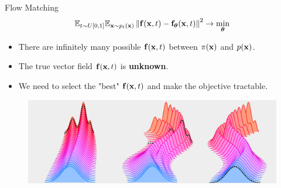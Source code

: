\documentclass{beamer}
\begin{document}
\begin{frame}{Flow Matching}
	\[
		\mathbb{E}_{t \sim U[0, 1]} \mathbb{E}_{\mathbf{x} \sim p_t(\mathbf{x})}\left\| \mathbf{f}(\mathbf{x}, t) - \mathbf{f}_{\boldsymbol{\theta}}(\mathbf{x}, t) \right\|^2 \rightarrow \min_{\boldsymbol{\theta}}
	\]
	\vspace{-0.5cm}
	\begin{itemize}
		\item There are infinitely many possible $\mathbf{f}(\mathbf{x}, t)$ between $\pi(\mathbf{x})$ and $p(\mathbf{x})$.
		\item The true vector field  $\mathbf{f}(\mathbf{x}, t)$ is \textbf{unknown}.
		\item We need to select the "best" $\mathbf{f}(\mathbf{x}, t)$ and make the objective tractable.
	\end{itemize}
	\begin{figure}
		\centering
		\includegraphics[width=\linewidth]{figs/multiple_dynamics}
	\end{figure}
\end{frame}
\end{document}
